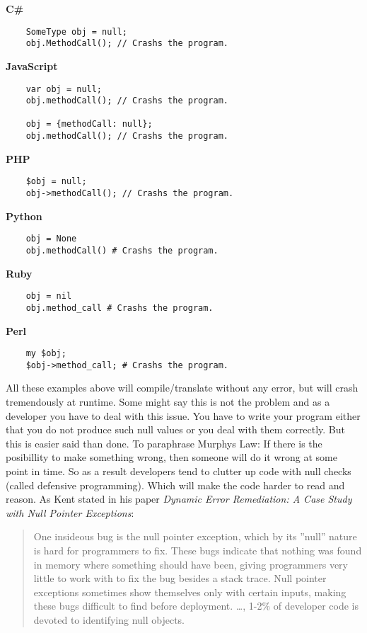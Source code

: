 \documentclass[a4paper,12pt]{article}
\begin{document}
\textbf{C\#}
\begin{verbatim}
    SomeType obj = null;
    obj.MethodCall(); // Crashs the program.
\end{verbatim}

\textbf{JavaScript}
\begin{verbatim}
    var obj = null;
    obj.methodCall(); // Crashs the program.

    obj = {methodCall: null};
    obj.methodCall(); // Crashs the program.
\end{verbatim}

\textbf{PHP}
\begin{verbatim}
    $obj = null;
    obj->methodCall(); // Crashs the program.    
\end{verbatim}

\textbf{Python}
\begin{verbatim}
    obj = None
    obj.methodCall() # Crashs the program.
\end{verbatim}

\textbf{Ruby}
\begin{verbatim}
    obj = nil
    obj.method_call # Crashs the program.
\end{verbatim}

\textbf{Perl}
\begin{verbatim}
    my $obj;
    $obj->method_call; # Crashs the program.    
\end{verbatim}

All these examples above will compile/translate without any error, but will crash tremendously at runtime. Some might say this is not the problem and as a developer you have to deal with this issue. You have to write your program either that you do not produce such null values or you deal with them correctly. But this is easier said than done. To paraphrase Murphys Law: If there is the posibillity to make something wrong, then someone will do it wrong at some point in time. So as a result developers tend to clutter up code with null checks (called defensive programming). Which will make the code harder to read and reason. As Kent\cite{kent-dyn-err-remediation} stated in his paper \textit{Dynamic Error Remediation: A Case Study with Null Pointer Exceptions}:

\begin{quotation}
    One insideous bug is the null pointer exception, which by its ”null” nature is hard for programmers to fix. These bugs indicate that nothing was found in memory where something should have been, giving programmers very little to work with to fix the bug besides a stack trace. Null pointer exceptions sometimes show themselves only with certain inputs, making these bugs difficult to find before deployment. \ldots, 1-2\% of developer code is devoted to identifying null objects.
\end{quotation}
\end{document}
